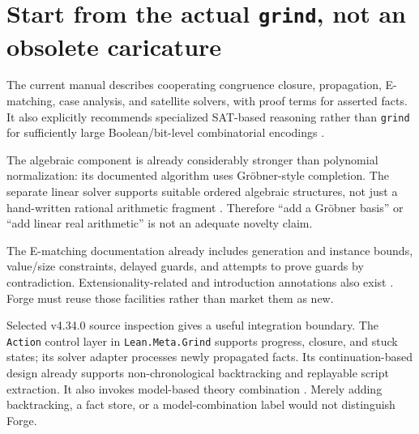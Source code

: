 \documentclass[11pt,a4paper]{article}
\newcommand{\grind}{\texttt{grind}}
\newcommand{\code}[1]{\texttt{#1}}
\begin{document}
\section{Start from the actual \grind{}, not an obsolete caricature}
The current manual describes cooperating congruence closure, propagation, E-matching, case analysis, and satellite solvers, with proof terms for asserted facts. It also explicitly recommends specialized SAT-based reasoning rather than \grind{} for sufficiently large Boolean/bit-level combinatorial encodings \cite{grindmanual}.

The algebraic component is already considerably stronger than polynomial normalization: its documented algorithm uses Gr\"obner-style completion. The separate linear solver supports suitable ordered algebraic structures, not just a hand-written rational arithmetic fragment \cite{grindalgebra,grindlinear}. Therefore ``add a Gr\"obner basis'' or ``add linear real arithmetic'' is not an adequate novelty claim.

The E-matching documentation already includes generation and instance bounds, value/size constraints, delayed guards, and attempts to prove guards by contradiction. Extensionality-related and introduction annotations also exist \cite{grindematch}. Forge must reuse those facilities rather than market them as new.

Selected v4.34.0 source inspection gives a useful integration boundary. The \code{Action} control layer in \code{Lean.Meta.Grind} supports progress, closure, and stuck states; its solver adapter processes newly propagated facts. Its continuation-based design already supports non-chronological backtracking and replayable script extraction. It also invokes model-based theory combination \cite{grindaction}. Merely adding backtracking, a fact store, or a model-combination label would not distinguish Forge.
\end{document}
